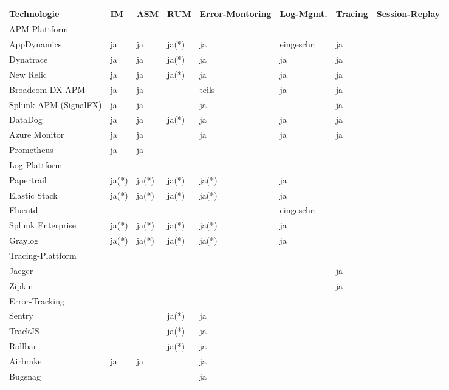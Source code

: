 \begingroup
\centering
\setlength{\LTleft}{-20cm plus -1fill}
\setlength{\LTright}{\LTleft}
\begin{longtable}{|p{4.10cm}|p{0.90cm}|p{0.90cm}|p{1.9cm}|p{1.75cm}|p{1.5cm}|p{1.4cm}|p{1.3cm}|}
\hline
Technologie & IM & ASM & RUM & Error-Montoring & Log-Mgmt. & Tracing & Session-Replay \\
\endhead
\hline
\hline
\multicolumn{8}{|l|}{APM-Plattform} \\
\hline
AppDynamics & ja & ja & ja(*) & ja & eingeschr. & ja &  \\
\hline
Dynatrace & ja & ja & ja(*) & ja & ja & ja &  \\
\hline
New Relic & ja & ja & ja(*) & ja & ja & ja &  \\
\hline
Broadcom DX APM & ja & ja &  & teils & ja & ja &  \\
\hline
Splunk APM (SignalFX) & ja & ja &  & ja &  & ja &  \\
\hline
DataDog & ja & ja & ja(*) & ja & ja & ja &  \\
\hline
Azure Monitor & ja & ja &  & ja & ja & ja &  \\
\hline
Prometheus & ja & ja &  &  &  &  &  \\
\hline
\hline
\multicolumn{8}{|l|}{Log-Plattform} \\
\hline
Papertrail & ja(*) & ja(*) & ja(*) & ja(*) & ja &  &  \\
\hline
Elastic Stack & ja(*) & ja(*) & ja(*) & ja(*) & ja &  &  \\
\hline
Fluentd &  &  &  &  & eingeschr. &  &  \\
\hline
Splunk \mbox{Enterprise} & ja(*) & ja(*) & ja(*) & ja(*) & ja &  &  \\
\hline
Graylog & ja(*) & ja(*) & ja(*) & ja(*) & ja &  &  \\
\hline
\hline
\multicolumn{8}{|l|}{Tracing-Plattform} \\
\hline
Jaeger &  &  &  &  &  & ja &  \\
\hline
Zipkin &  &  &  &  &  & ja &  \\
\hline
\hline
\multicolumn{8}{|l|}{Error-Tracking} \\
\hline
Sentry &  &  & ja(*) & ja &  &  &  \\
\hline
TrackJS &  &  & ja(*) & ja &  &  &  \\
\hline
Rollbar &  &  & ja(*) & ja &  &  &  \\
\hline
Airbrake & ja & ja &  & ja &  &  &  \\
\hline
Bugsnag &  &  &  & ja &  &  &  \\

\end{longtable}
